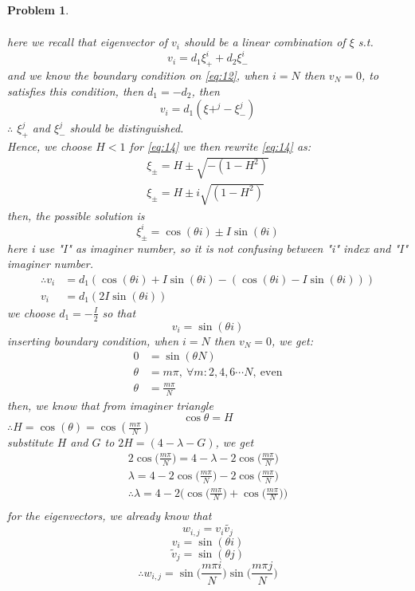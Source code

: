 \documentclass[a4paper,12pt]{article}
\newtheorem{prob}{Problem}[]
\begin{document}
\begin{prob}
\begin{enumerate}[label=(\alph*)]
\begin{equation}
\begin{aligned}
		\end{aligned}
		\end{equation}
		here we recall that eigenvector of $v_i$ should be a linear combination of $\xi$ s.t. $$v_i = d_1\xi_+^i + d_2\xi_-^i$$
		and we know the boundary condition on \eqref{eq:12}, when $i=N$ then $v_N=0$, to satisfies this condition, then $d_1 = -d_2$, then $$v_i = d_1(\xi+^j - \xi_-^j)$$ $\therefore$ $\xi_+^j$ and $\xi_-^j$ should be distinguished.\\
		Hence, we choose $H<1$ for \eqref{eq:14} we then rewrite \eqref{eq:14} as:
		\begin{equation*}
		\begin{aligned}
		\xi_\pm = H \pm \sqrt{-(1-H^2)}\\
		\xi_\pm = H \pm i\sqrt{(1-H^2)}
		\end{aligned}
		\end{equation*}
		then, the possible solution is $$\xi_\pm^i = \cos(\theta i) \pm I \sin(\theta i)$$
		here i use "I" as imaginer number, so it is not confusing between "i" index and "I" imaginer number.
		\begin{equation*}
		\begin{aligned}
		\therefore v_i &= d_1(\cos(\theta i) + I \sin(\theta i) - (\cos(\theta i) - I \sin(\theta i)))\\
		v_i &= d_1(2 I \sin(\theta i))
		\end{aligned}
		\end{equation*}
		we choose $d_1 = -\frac{I}{2}$ so that $$v_i = \sin(\theta i)$$
		inserting boundary condition, when $i=N$ then $v_N=0$, we get:
		\begin{equation*}
		\begin{aligned}
		0 &= \sin(\theta N)\\
		\theta &= m\pi,\ \forall m:2,4,6\cdots N,\ \text{even}\\
		\theta &= \frac{m\pi}{N}
		\end{aligned}
		\end{equation*}
		then, we know that from imaginer triangle $$\cos \theta = H$$
		$\therefore H = \cos(\theta) = \cos(\frac{m\pi}{N})$\\
		substitute $H$ and $G$ to $2H=(4-\lambda-G)$, we get
		\begin{equation*}
		\begin{aligned}
		2 \cos\bigg(\frac{m\pi}{N}\bigg) = 4-\lambda -2 \cos\bigg(\frac{m\pi}{N}\bigg)\\
		\lambda = 4 -2 \cos\bigg(\frac{m\pi}{N}\bigg) -2 \cos\bigg(\frac{m\pi}{N}\bigg)\\
		\therefore \lambda = 4 -2 \bigg(\cos\bigg(\frac{m\pi}{N}\bigg) + \cos\bigg(\frac{m\pi}{N}\bigg) \bigg)\\
		\end{aligned}
		\end{equation*}
		for the eigenvectors, we already know that 
		$$w_{i,j} = v_i \tilde{v_j}$$
		$$v_i = \sin(\theta i)$$
		$$\tilde{v}_j = \sin(\theta j)$$
		$$\therefore w_{i,j} = \sin\bigg(\frac{m\pi i}{N}\bigg) \sin\bigg(\frac{m\pi j}{N}\bigg)$$
		

\end{enumerate}
\end{prob}
\end{document}
